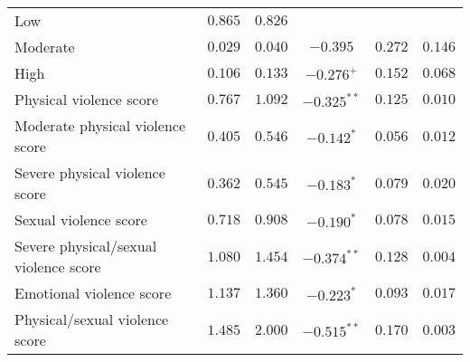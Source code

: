 \begin{tabular}{lccccc}
Low & $0.865$ & $0.826$ &  &  & \\
Moderate & $0.029$ & $0.040$ & $-0.395$ & $0.272$ & $0.146$\\
High & $0.106$ & $0.133$ & $-0.276^{+}$ & $0.152$ & $0.068$\\
Physical violence score & $0.767$ & $1.092$ & $-0.325^{**}$ & $0.125$ & $0.010$\\
Moderate physical violence score & $0.405$ & $0.546$ & $-0.142^{*}$ & $0.056$ & $0.012$\\
Severe physical violence score & $0.362$ & $0.545$ & $-0.183^{*}$ & $0.079$ & $0.020$\\
Sexual violence score & $0.718$ & $0.908$ & $-0.190^{*}$ & $0.078$ & $0.015$\\
Severe physical/sexual violence score & $1.080$ & $1.454$ & $-0.374^{**}$ & $0.128$ & $0.004$\\
Emotional violence score & $1.137$ & $1.360$ & $-0.223^{*}$ & $0.093$ & $0.017$\\
Physical/sexual violence score & $1.485$ & $2.000$ & $-0.515^{**}$ & $0.170$ & $0.003$\\
\bottomrule
\end{tabular}
